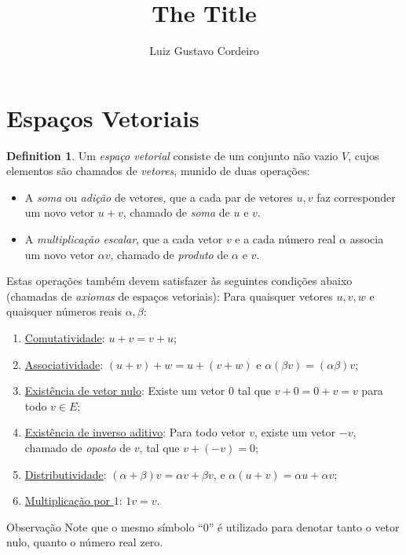 \documentclass[a4paper]{amsart}
\title{The Title}
\author{Luiz Gustavo Cordeiro%
}
\theoremstyle{plain}    \newtheorem{theorem}[generalnumbering]{Theorem}
\theoremstyle{plain}    \newtheorem{corollary}[generalnumbering]{Corollary}
\theoremstyle{definition}   \newtheorem{definition}[generalnumbering]{Definition}
\theoremstyle{definition}   \newtheorem{example}[generalnumbering]{Example}
\theoremstyle{plain}    \newtheorem{proposition}[generalnumbering]{Proposition}
\theoremstyle{plain}    \newtheorem{lemma}[generalnumbering]{Lemma}
\newcommand{\namefordifferentenvironment}{}
\theoremstyle{plain}    \newtheorem{plainstyle}[generalnumbering]{\namefordifferentenvironment}
\theoremstyle{plain}    \newtheorem*{plainstyle*}{\namefordifferentenvironment}
\theoremstyle{definition}    \newtheorem{definitionstyle}[generalnumbering]{\namefordifferentenvironment}
\theoremstyle{definition}    \newtheorem*{definitionstyle*}{\namefordifferentenvironment}
\newenvironment{denv*}[1]{\renewcommand{\namefordifferentenvironment}{#1}\begin{definitionstyle*}}{\end{definitionstyle*}}
\begin{document}
\maketitle

\section{Espaços Vetoriais}

\begin{definition}
Um \emph{espaço vetorial} consiste de um conjunto não vazio $V$, cujos elementos são chamados de \emph{vetores}, munido de duas operações:
\begin{itemize}
    \item A \emph{soma} ou \emph{adição} de vetores, que a cada par de vetores $u,v$ faz corresponder um novo vetor $u+v$, chamado de \emph{soma} de $u$ e $v$.
    \item A \emph{multiplicação escalar}, que a cada vetor $v$ e a cada número real $\alpha$ associa um novo vetor $\alpha v$, chamado de \emph{produto} de $\alpha$ e $v$.
\end{itemize}
    Estas operações também devem satisfazer às seguintes condições abaixo (chamadas de \emph{axiomas} de espaços vetoriais): Para quaisquer vetores $u,v,w$ e quaisquer números reais $\alpha,\beta$:
    \begin{enumerate}[label=(\roman*)]
        \item \uline{Comutatividade}: $u+v=v+u$;
        \item \uline{Associatividade}: $(u+v)+w=u+(v+w)$ e $\alpha(\beta v)=(\alpha\beta)v$;
        \item \uline{Existência de vetor nulo}: Existe um vetor $0$ tal que $v+0=0+v=v$ para todo $v\in E$;
        \item \uline{Existência de inverso aditivo}: Para todo vetor $v$, existe um vetor $-v$, chamado de \emph{oposto} de $v$, tal que $v+(-v)=0$;
        \item \uline{Distributividade}: $(\alpha+\beta)v=\alpha v+\beta v$, e $\alpha(u+v)=\alpha u+\alpha v$;
        \item \uline{Multiplicação por $1$}: $1v=v$.
    \end{enumerate}
\end{definition}

\begin{denv*}{Observação}
    Note que o mesmo símbolo ``$0$'' é utilizado para denotar tanto o vetor nulo, quanto o número real zero.
\end{denv*}
\end{document}
